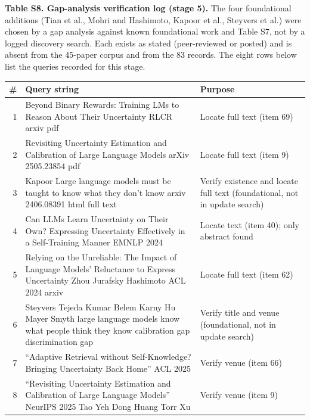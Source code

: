 \documentclass[acmsmall]{acmart}
\begin{document}
\noindent\textbf{Table S8. Gap-analysis verification log (stage 5).} The four foundational additions (Tian et al., Mohri and Hashimoto, Kapoor et al., Steyvers et al.) were chosen by a gap analysis against known foundational work and Table S7, not by a logged discovery search. Each exists as stated (peer-reviewed or posted) and is absent from the 45-paper corpus and from the 83 records. The eight rows below list the queries recorded for this stage.
\begin{center}
\small
\begin{tabular}{@{}r p{7.2cm} p{4.2cm}@{}}
\toprule
\# & Query string & Purpose \\
\midrule
1 & Beyond Binary Rewards: Training LMs to Reason About Their Uncertainty RLCR arxiv pdf & Locate full text (item 69) \\
2 & Revisiting Uncertainty Estimation and Calibration of Large Language Models arXiv 2505.23854 pdf & Locate full text (item 9) \\
3 & Kapoor Large language models must be taught to know what they don't know arxiv 2406.08391 html full text & Verify existence and locate full text (foundational, not in update search) \\
4 & Can LLMs Learn Uncertainty on Their Own? Expressing Uncertainty Effectively in a Self-Training Manner EMNLP 2024 & Locate text (item 40); only abstract found \\
5 & Relying on the Unreliable: The Impact of Language Models' Reluctance to Express Uncertainty Zhou Jurafsky Hashimoto ACL 2024 arxiv & Locate full text (item 62) \\
6 & Steyvers Tejeda Kumar Belem Karny Hu Mayer Smyth large language models know what people think they know calibration gap discrimination gap & Verify title and venue (foundational, not in update search) \\
7 & ``Adaptive Retrieval without Self-Knowledge? Bringing Uncertainty Back Home'' ACL 2025 & Verify venue (item 66) \\
8 & ``Revisiting Uncertainty Estimation and Calibration of Large Language Models'' NeurIPS 2025 Tao Yeh Dong Huang Torr Xu & Verify venue (item 9) \\
\bottomrule
\end{tabular}
\end{center}



\end{document}

